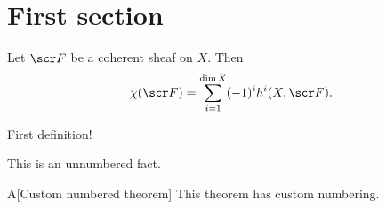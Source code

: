 \documentclass[A4paper, 12pt, british, reqno]{amsart}
\begin{document}
\maketitle

\tableofcontents

\section{First section}

Let $\F$ be a coherent sheaf on $X$.
Then
\[ \chi(\F)=\sum_{i=1}^{\dim{X}}(-1)^{i}h^{i}(X,\F). \]

\begin{defn}
    First definition!
\end{defn}

\begin{ufact}
    This is an unnumbered fact.
\end{ufact}

\begin{cthm}{A}[Custom numbered theorem]
    This theorem has custom numbering.
\end{cthm}




\vspace{0.3cm}
\end{document}
